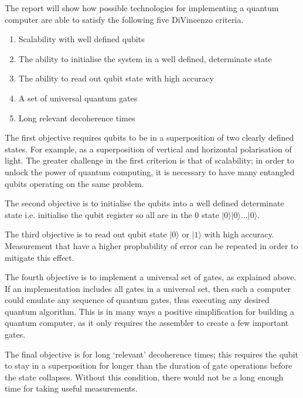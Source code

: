 The report will show how possible technologies for implementing a quantum computer are able to satisfy the following five DiVincenzo criteria.
\begin{enumerate}
    \item Scalability with well defined qubits
    \item The ability to initialise the system in a well defined, determinate state
    \item The ability to read out qubit state with high accuracy
    \item A set of universal quantum gates
    \item Long relevant decoherence times
    \setcounter{enumTemp}{\theenumi}
\end{enumerate}

The first objective requires qubits to be in a superposition of two clearly defined states. For example, as a superposition of vertical and horizontal polarisation of light. The greater challenge in the first criterion is that of scalability; in order to unlock the power of quantum computing, it is necessary to have many entangled qubits operating on the same problem.

The second objective is to initialise the qubits into a well defined determinate state i.e. initialise the qubit register so all are in the 0 state $\vert 0\rangle \vert 0\rangle$...$\vert 0 \rangle$. \cite{lapierre_divincenzo_2021}

The third objective is to read out qubit state $\vert 0\rangle$ or $\vert 1 \rangle$ with high accuracy. Measurement that have a higher propbability of error can be repeated in order to mitigate this effect.

The fourth objective is to implement a universal set of gates, as explained above. If an implementation includes all gates in a universal set, then such a computer could emulate any sequence of quantum gates, thus executing any desired  quantum algorithm. This is in many ways a positive simplification for building a quantum computer, as it only requires the assembler to create a few important gates. 

The final objective is for long `relevant' decoherence times; this requires the qubit to stay in a superposition for longer than the duration of gate operations before the state collapses. Without this condition, there would not be a long enough time for taking useful measurements.